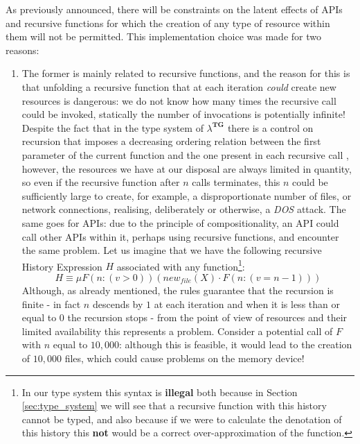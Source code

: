 \begin{note}
    As previously announced, there will be constraints on the latent effects of APIs and recursive functions for which the creation of any type of resource within them will not be permitted. This implementation choice was made for two reasons:
    \begin{enumerate}[label=(\roman*)]
        \item The former is mainly related to recursive functions, and the reason for this is that unfolding a recursive function that at each iteration \emph{could} create new resources is dangerous: we do not know how many times the recursive call could be invoked, statically the number of invocations is potentially infinite! Despite the fact that in the type system of $\lambda^{\textbf{TG}}$ there is a control on recursion that imposes a decreasing ordering relation between the first parameter of the current function and the one present in each recursive call \cite{coverage}, however, the resources we have at our disposal are always limited in quantity, so even if the recursive function after $n$ calls terminates, this $n$ could be sufficiently large to create, for example, a disproportionate number of files, or network connections, realising, deliberately or otherwise, a \emph{DOS} \cite{dos} attack. The same goes for APIs: due to the principle of compositionality, an API could call other APIs within it, perhaps using recursive functions, and encounter the same problem.
        Let us imagine that we have the following recursive History Expression $H$ associated with any function\footnote{In our type system this syntax is \textbf{illegal} both because in Section \ref{sec:type_system} we will see that a recursive function with this history cannot be typed, and also because if we were to calculate the denotation of this history this \textbf{not} would be a correct over-approximation of the function.}:
        \begin{equation}
            H \equiv \mu F(n{:}(v > 0))(new_{file}(X) \cdot F(n{:}(v = n - 1)))
        \end{equation}
        Although, as already mentioned, the rules guarantee that the recursion is finite - in fact $n$ descends by $1$ at each iteration and when it is less than or equal to $0$ the recursion stops - from the point of view of resources and their limited availability this represents a problem. Consider a potential call of $F$ with $n$ equal to $10,000$: although this is feasible, it would lead to the creation of $10,000$ files, which could cause problems on the memory device!

\end{enumerate}
\end{note}
